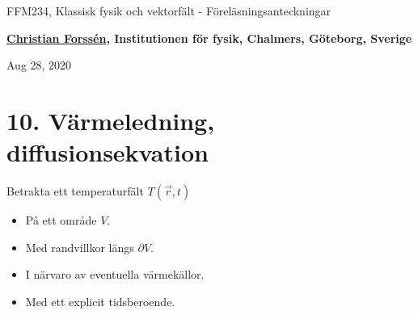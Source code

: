 \documentclass[%
oneside,                 %
final,                   %
10pt]{article}
\begin{document}

\newcommand{\exercisesection}[1]{\subsection*{#1}}







\thispagestyle{empty}

\begin{center}
{\LARGE\bf
\begin{spacing}{1.25}
FFM234, Klassisk fysik och vektorfält - Föreläsningsanteckningar
\end{spacing}
}
\end{center}


\begin{center}
{\bf \href{{http://fy.chalmers.se/subatom/tsp/}}{Christian Forssén}, Institutionen för fysik, Chalmers, Göteborg, Sverige${}^{}$} \\ [0mm]
\end{center}

\begin{center}
\end{center}
    

\begin{center}
Aug 28, 2020
\end{center}

\vspace{1cm}


\section*{10. Värmeledning, diffusionsekvation}

Betrakta ett temperaturfält $T(\vec{r},t)$
\begin{itemize}
\item På ett område $V$.

\item Med randvillkor längs $\partial V$.

\item I närvaro av eventuella värmekällor.

\item Med ett explicit tidsberoende.
\end{itemize}
\end{document}
